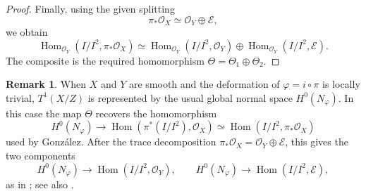 \documentclass[11pt,twoside]{amsart}
\theoremstyle{plain}
\numberwithin{equation}{section}
\theoremstyle{definition}
\newtheorem{remark}[theorem]{Remark}
\begin{document}
\begin{proof}
Finally, using the given splitting
\[
    \pi_*\mathcal O_X\simeq \mathcal O_Y\oplus \mathcal E,
\]
we obtain
\[
    \operatorname{Hom}_{\mathcal O_Y}(I/I^2,\pi_*\mathcal O_X)
    \simeq
    \operatorname{Hom}_{\mathcal O_Y}(I/I^2,\mathcal O_Y)
    \oplus
    \operatorname{Hom}_{\mathcal O_Y}(I/I^2,\mathcal E).
\]
The composite is the required homomorphism \(\Theta=\Theta_1\oplus\Theta_2\).
\end{proof}

\begin{remark}
When \(X\) and \(Y\) are smooth and the deformation of \(\varphi=i\circ\pi\) is
locally trivial, \(T^1(X/Z)\) is represented by the usual global normal space
\(H^0(N_\varphi)\). In this case the map \(\Theta\) recovers the homomorphism
\[
    H^0(N_\varphi)
    \longrightarrow
    \operatorname{Hom}(\pi^*(I/I^2),\mathcal O_X)
    \simeq
    \operatorname{Hom}(I/I^2,\pi_*\mathcal O_X)
\]
used by Gonz\'alez. After the trace decomposition
\(\pi_*\mathcal O_X=\mathcal O_Y\oplus\mathcal E\), this gives the two components
\[
    H^0(N_\varphi)\to \operatorname{Hom}(I/I^2,\mathcal O_Y),
    \qquad
    H^0(N_\varphi)\to \operatorname{Hom}(I/I^2,\mathcal E),
\]
as in \cite[Proposition~3.7]{Gonzalez2005}; see also
\cite[Proposition~1.2]{GallegoGonzalezPurnaprajna2010}.
\end{remark}
\end{document}
